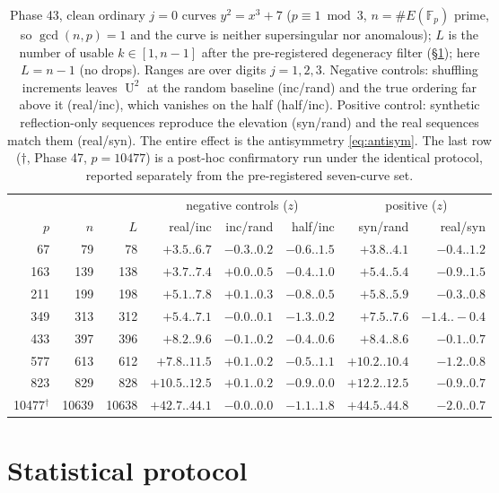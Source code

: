\documentclass[11pt]{article}
\theoremstyle{definition}
\newcommand{\Fp}{\mathbb{F}_p}
\DeclareMathOperator{\Uk}{U}
\begin{document}
\begin{table}[t]
\centering
\small
\begin{tabular}{rrrrrrrr}
\toprule
& & & \multicolumn{3}{c}{negative controls ($z$)} & \multicolumn{2}{c}{positive ($z$)}\\
\cmidrule(lr){4-6}\cmidrule(lr){7-8}
$p$ & $n$ & $L$ & real/inc & inc/rand & half/inc & syn/rand & real/syn\\
\midrule
 67 &  79 &  78 & $+3.5..6.7$  & $-0.3..0.2$ & $-0.6..1.5$ & $+3.8..4.1$  & $-0.4..1.2$\\
163 & 139 & 138 & $+3.7..7.4$  & $+0.0..0.5$ & $-0.4..1.0$ & $+5.4..5.4$  & $-0.9..1.5$\\
211 & 199 & 198 & $+5.1..7.8$  & $+0.1..0.3$ & $-0.8..0.5$ & $+5.8..5.9$  & $-0.3..0.8$\\
349 & 313 & 312 & $+5.4..7.1$  & $-0.0..0.1$ & $-1.3..0.2$ & $+7.5..7.6$  & $-1.4..-0.4$\\
433 & 397 & 396 & $+8.2..9.6$  & $-0.1..0.2$ & $-0.4..0.6$ & $+8.4..8.6$  & $-0.1..0.7$\\
577 & 613 & 612 & $+7.8..11.5$ & $+0.1..0.2$ & $-0.5..1.1$ & $+10.2..10.4$& $-1.2..0.8$\\
823 & 829 & 828 & $+10.5..12.5$& $+0.1..0.2$ & $-0.9..0.0$ & $+12.2..12.5$& $-0.9..0.7$\\
\midrule
10477$^\dagger$ & 10639 & 10638 & $+42.7..44.1$ & $-0.0..0.0$ & $-1.1..1.8$ & $+44.5..44.8$ & $-2.0..0.7$\\
\bottomrule
\end{tabular}
\caption{Phase 43, clean ordinary $j{=}0$ curves $y^2=x^3+7$
($p\equiv 1\bmod 3$, $n=\#E(\Fp)$ prime, so $\gcd(n,p)=1$ and the curve
is neither supersingular nor anomalous); $L$ is the number of usable
$k\in[1,n-1]$ after the pre-registered degeneracy filter
(\S\ref{sec:stats}); here $L=n-1$ (no drops). Ranges are over digits
$j=1,2,3$. Negative controls: shuffling increments leaves $\Uk^2$ at the
random baseline (inc/rand) and the true ordering far above it (real/inc),
which vanishes on the half (half/inc). Positive control: synthetic
reflection-only sequences reproduce the elevation (syn/rand) and the real
sequences match them (real/syn). The entire effect is the antisymmetry
\eqref{eq:antisym}. The last row ($\dagger$, Phase 47, $p=10477$) is a
post-hoc confirmatory run under the identical protocol, reported
separately from the pre-registered seven-curve set.}
\label{tab:p43}
\end{table}

\section{Statistical protocol}\label{sec:stats}
\end{document}
